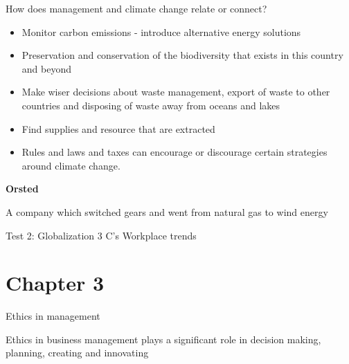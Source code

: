 \documentclass[11pt]{article}
\begin{document}
















How does management and climate change relate or connect?

\begin{itemize}
    \item Monitor carbon emissions - introduce alternative energy solutions
    \item Preservation and conservation of the biodiversity that exists in this country and beyond
    \item Make wiser decisions about waste management, export of waste to other countries and disposing of waste away from oceans and lakes
    \item Find supplies and resource that are extracted 
    \item Rules and laws and taxes can encourage or discourage certain strategies around climate change.
\end{itemize}

\textbf{Orsted}

A company which switched gears and went from natural gas to wind energy


Test 2:
    Globalization
    3 C's
    Workplace trends

\section{Chapter 3}

Ethics in management

Ethics in business management plays a significant role in decision making, planning, creating and innovating
\end{document}

